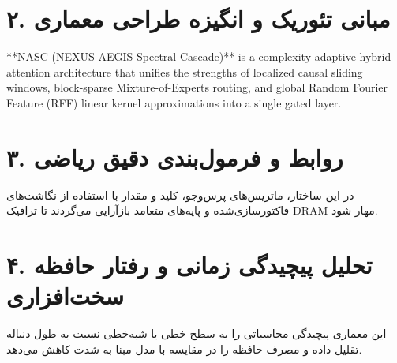 \documentclass[12pt,a4paper]{article}
\begin{document}
\section*{۲. مبانی تئوریک و انگیزه طراحی معماری}
**NASC (NEXUS-AEGIS Spectral Cascade)** is a complexity-adaptive hybrid attention architecture that unifies the strengths of localized causal sliding windows, block-sparse Mixture-of-Experts routing, and global Random Fourier Feature (RFF) linear kernel approximations into a single gated layer.

\section*{۳. روابط و فرمول‌بندی دقیق ریاضی}
در این ساختار، ماتریس‌های پرس‌وجو، کلید و مقدار با استفاده از نگاشت‌های فاکتورسازی‌شده و پایه‌های متعامد بازآرایی می‌گردند تا ترافیک DRAM مهار شود.

\section*{۴. تحلیل پیچیدگی زمانی و رفتار حافظه سخت‌افزاری}
این معماری پیچیدگی محاسباتی را به سطح خطی یا شبه‌خطی نسبت به طول دنباله تقلیل داده و مصرف حافظه را در مقایسه با مدل مبنا به شدت کاهش می‌دهد.
\end{document}
